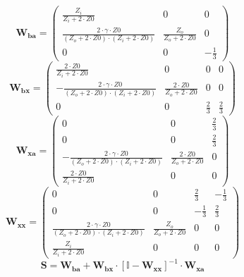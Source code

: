 \[ \mathbf{W_{ba}} = \left(\begin{smallmatrix} \frac{Z_i}{Z_i+2\cdot
Z0} & 0 & 0 \\ \frac{2\cdot \gamma\cdot Z0}{\left(Z_o+2\cdot
Z0\right)\cdot\left(Z_i+2\cdot Z0\right)} & \frac{Z_o}{Z_o+2\cdot Z0}
& 0 \\ 0 & 0 & -\frac{1}{3} \end{smallmatrix}\right) \]
\[ \mathbf{W_{bx}} = \left(\begin{smallmatrix} \frac{2\cdot
Z0}{Z_i+2\cdot Z0} & 0 & 0 & 0 \\ -\frac{2\cdot \gamma\cdot
Z0}{\left(Z_o+2\cdot Z0\right)\cdot\left(Z_i+2\cdot Z0\right)} &
\frac{2\cdot Z0}{Z_o+2\cdot Z0} & 0 & 0 \\ 0 & 0 & \frac{2}{3} &
\frac{2}{3} \end{smallmatrix}\right) \]
\[ \mathbf{W_{xa}} = \left(\begin{smallmatrix} 0 & 0 & \frac{2}{3} \\
0 & 0 & \frac{2}{3} \\ -\frac{2\cdot \gamma\cdot Z0}{\left(Z_o+2\cdot
Z0\right)\cdot\left(Z_i+2\cdot Z0\right)} & \frac{2\cdot
Z0}{Z_o+2\cdot Z0} & 0 \\ \frac{2\cdot Z0}{Z_i+2\cdot Z0} & 0 & 0
\end{smallmatrix}\right) \]
\[ \mathbf{W_{xx}} = \left(\begin{smallmatrix} 0 & 0 & \frac{2}{3} &
-\frac{1}{3} \\ 0 & 0 & -\frac{1}{3} & \frac{2}{3} \\ \frac{2\cdot
\gamma\cdot Z0}{\left(Z_o+2\cdot Z0\right)\cdot\left(Z_i+2\cdot
Z0\right)} & \frac{Z_o}{Z_o+2\cdot Z0} & 0 & 0 \\
\frac{Z_i}{Z_i+2\cdot Z0} & 0 & 0 & 0 \end{smallmatrix}\right) \]
\[ \mathbf{S}=\mathbf{W_{ba}}+\mathbf{W_{bx}}\cdot\left[ \mathbb{I}
-\mathbf{W_{xx}}\right]^{-1}\cdot\mathbf{W_{xa}} \]

